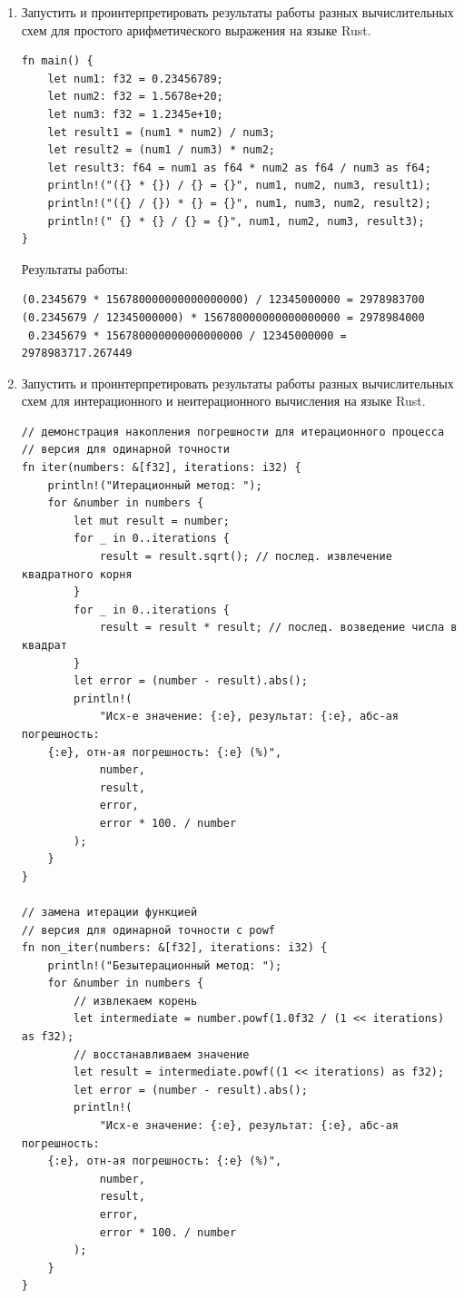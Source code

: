 \documentclass[a4paper,14pt]{extarticle}
\begin{document}
\begin{enumerate}[1.]
    \item Запустить и проинтерпретировать результаты работы разных вычислительных схем для
    простого арифметического выражения на языке Rust.\\
    \begin{verbatim}
fn main() {
    let num1: f32 = 0.23456789;
    let num2: f32 = 1.5678e+20;
    let num3: f32 = 1.2345e+10;
    let result1 = (num1 * num2) / num3;
    let result2 = (num1 / num3) * num2;
    let result3: f64 = num1 as f64 * num2 as f64 / num3 as f64;
    println!("({} * {}) / {} = {}", num1, num2, num3, result1);
    println!("({} / {}) * {} = {}", num1, num3, num2, result2);
    println!(" {} * {} / {} = {}", num1, num2, num3, result3);
}
    \end{verbatim}
    Результаты работы:
    \begin{verbatim}
(0.2345679 * 156780000000000000000) / 12345000000 = 2978983700
(0.2345679 / 12345000000) * 156780000000000000000 = 2978984000
 0.2345679 * 156780000000000000000 / 12345000000 = 2978983717.267449
    \end{verbatim} 
    
    \item Запустить и проинтерпретировать результаты работы разных вычислительных схем для
    интерационного и неитерационного вычисления на языке Rust.\\
    \begin{verbatim}
// демонстрация накопления погрешности для итерационного процесса
// версия для одинарной точности
fn iter(numbers: &[f32], iterations: i32) {
    println!("Итерационный метод: ");
    for &number in numbers {
        let mut result = number;
        for _ in 0..iterations {
            result = result.sqrt(); // послед. извлечение квадратного корня
        }
        for _ in 0..iterations {
            result = result * result; // послед. возведение числа в квадрат
        }
        let error = (number - result).abs();
        println!(
            "Исх-е значение: {:e}, результат: {:e}, абс-ая погрешность:
    {:e}, отн-ая погрешность: {:e} (%)",
            number,
            result,
            error,
            error * 100. / number
        );
    }
}

// замена итерации функцией
// версия для одинарной точности c powf
fn non_iter(numbers: &[f32], iterations: i32) {
    println!("Безытерационный метод: ");
    for &number in numbers {
        // извлекаем корень
        let intermediate = number.powf(1.0f32 / (1 << iterations) as f32);
        // восстанавливаем значение
        let result = intermediate.powf((1 << iterations) as f32);
        let error = (number - result).abs();
        println!(
            "Исх-е значение: {:e}, результат: {:e}, абс-ая погрешность:
    {:e}, отн-ая погрешность: {:e} (%)",
            number,
            result,
            error,
            error * 100. / number
        );
    }
}


\end{verbatim}
\end{enumerate}
\end{document}
